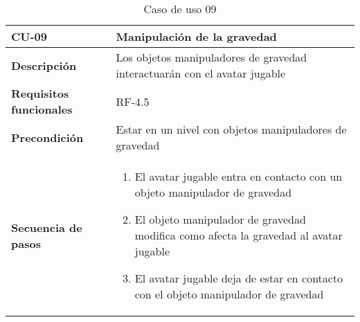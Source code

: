 \begin{longtable}{l|l}
\caption{Caso de uso 09}\\
\begin{minipage}{0.25\columnwidth}
\textbf{CU-09} 
\end{minipage}
&
\begin{minipage}{0.65\columnwidth}
Manipulación de la gravedad
\end{minipage}
\\ \hline

\begin{minipage}{0.25\columnwidth}
\textbf{Descripción} 
\end{minipage}
&
\begin{minipage}{0.65\columnwidth}
Los objetos manipuladores de gravedad interactuarán con el avatar jugable
\end{minipage}
\\ \hline

\begin{minipage}{0.25\columnwidth}
\textbf{Requisitos funcionales} 
\end{minipage}
&
\begin{minipage}{0.65\columnwidth}
RF-4.5
\end{minipage}
\\ \hline

\begin{minipage}{0.25\columnwidth}
\textbf{Precondición} 
\end{minipage}
&
\begin{minipage}{0.65\columnwidth}
Estar en un nivel con objetos manipuladores de gravedad
\end{minipage}
\\ \hline

\begin{minipage}{0.25\columnwidth}
\textbf{Secuencia de pasos} 
\end{minipage}
&
\begin{minipage}{0.65\columnwidth}
\begin{enumerate}
\item
El avatar jugable entra en contacto con un objeto manipulador de gravedad
\item
El objeto manipulador de gravedad modifica como afecta la gravedad al avatar jugable
\item
El avatar jugable deja de estar en contacto con el objeto manipulador de gravedad
\end{enumerate}
\end{minipage}
\\ \hline


\end{longtable}
